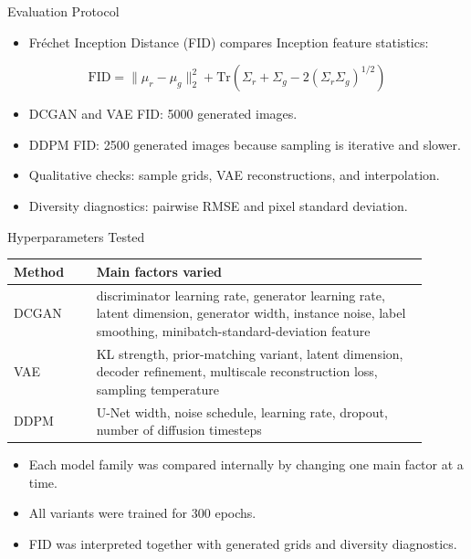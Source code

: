 \documentclass[aspectratio=169]{beamer}
\begin{document}
\begin{frame}{Evaluation Protocol}
  \begin{itemize}
    \item Fr\'echet Inception Distance (FID) compares Inception feature statistics:
  \end{itemize}
  \[
    \mathrm{FID} =
    \|\mu_r - \mu_g\|_2^2 +
    \mathrm{Tr}\!\left(\Sigma_r + \Sigma_g - 2(\Sigma_r\Sigma_g)^{1/2}\right)
  \]
  \begin{itemize}
    \item DCGAN and VAE FID: 5000 generated images.
    \item DDPM FID: 2500 generated images because sampling is iterative and slower.
    \item Qualitative checks: sample grids, VAE reconstructions, and interpolation.
    \item Diversity diagnostics: pairwise RMSE and pixel standard deviation.
  \end{itemize}
\end{frame}

\begin{frame}{Hyperparameters Tested}
  \small
  \begin{tabular}{p{0.18\linewidth}p{0.72\linewidth}}
    \toprule
    Method & Main factors varied \\
    \midrule
    DCGAN &
    discriminator learning rate, generator learning rate, latent dimension, generator width,
    instance noise, label smoothing, minibatch-standard-deviation feature \\
    VAE &
    KL strength, prior-matching variant, latent dimension, decoder refinement,
    multiscale reconstruction loss, sampling temperature \\
    DDPM &
    U-Net width, noise schedule, learning rate, dropout, number of diffusion timesteps \\
    \bottomrule
  \end{tabular}

  \vspace{0.35cm}
  \begin{itemize}
    \item Each model family was compared internally by changing one main factor at a time.
    \item All variants were trained for 300 epochs.
    \item FID was interpreted together with generated grids and diversity diagnostics.
  \end{itemize}
\end{frame}
\end{document}
